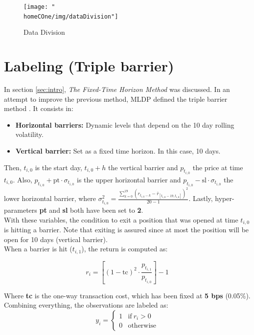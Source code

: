 \documentclass[a4paper]{article}
\newcommand{\homeCOne}{../../Chapter 1 - Metalabeling/Draft}
\begin{document}
\begin{figure}[htbp]
	\centering
	\texttt{[image: "\\homeCOne/img/dataDivision"]}
	\caption{Data Division}
	\label{fig:dataDivision}
\end{figure}	

\section{Labeling (Triple barrier)}
\label{sec:tripleBarrier}
In section \ref{sec:intro}, \textit{The Fixed-Time Horizon Method} was 
discussed. In an attempt to improve the previous method, MLDP defined 
the triple barrier method \cite{AdvFML}. It consists in:

\begin{itemize}
	\item \textbf{Horizontal barriers:} Dynamic levels that depend on 
	the 10 day rolling volatility.
	\item \textbf{Vertical barrier:} Set as a fixed time horizon. In 
	this case, 10 days.
\end{itemize}

Then, $t_{i,0}$ is the start day, $t_{i,0} + h$ the vertical barrier 
and $p_{t_{i,0}}$ the price at time $t_{i,0}$. Also, 
$p_{t_{i,0}} + \text{pt} \cdot \sigma_{t_{i,0}}$ is the upper 
horizontal barrier and $p_{t_{i,0}} - \text{sl} \cdot 
\sigma_{t_{i,0}}$ the lower horizontal barrier, where 
$\sigma_{t_{i,0}}^2 = \frac{\sum_{k=0}^{19}(r_{t_{i,0}-k} - \bar{r}
_{[t_{i,0}-19, t_{i,0}]})^2}{20 - 1}$. Lastly, hyper-parameters
\textbf{pt} and \textbf{sl} both have been set to 
\textbf{2}.\\

With these variables, the condition to exit a position that was opened 
at time $t_{i,0}$ is hitting a barrier. Note that exiting is assured 
since at most the position will be open for 10 days (vertical 
barrier).\\

When a barrier is hit ($t_{i,1}$), the return is computed as:

\begin{equation}
	r_i = \left[ (1 - \text{tc})^2 \cdot 
	\frac{p_{t_{i,1}}}{p_{t_{i,0}}} \right]- 1
\end{equation}

Where \textbf{tc} is the one-way transaction cost, which has been fixed at \textbf{5 bps} (0.05\%).\\

Combining everything, the observations are labeled as:
\begin{equation}
	y_i =
    \begin{cases}
      1 & \text{if}\ r_i > 0 \\
      0 & \text{otherwise}
    \end{cases}
\end{equation}
\end{document}
